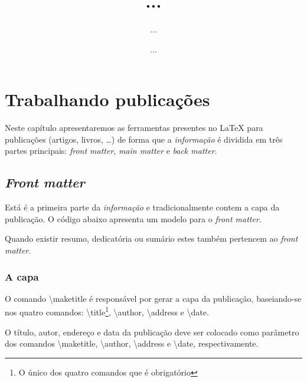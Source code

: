% 
% 
% 
% 
% 
\chapter{Trabalhando publicações} \label{sch:latex:publi}
Neste capítulo apresentaremos as ferramentas presentes no LaTeX para publicações (artigos, livros, \dots) de forma que a \textit{informação} é dividida em três partes principais: \textit{front matter}, \textit{main matter} e \textit{back matter}.

\section{\textit{Front matter}}

Está é a primeira parte da \textit{informação} e tradicionalmente contem a capa da publicação. O código abaixo apresenta um modelo para o \textit{front matter}.
\begin{latexcode}
    \frontmatter
    \title{...}
    \author{...}
    \address{...}
    \date{...}
    \maketitle
\end{latexcode}

Quando existir resumo, dedicatória ou sumário estes também pertencem ao \textit{front matter}.

\subsection{A capa}
O comando \textbackslash\textsf{maketitle} é responsável por gerar a capa da publicação, baseiando-se nos quatro comandos: \textbackslash\textsf{title}\footnote{O único dos quatro comandos que é obrigatório}, \textbackslash\textsf{author}, \textbackslash\textsf{address} e \textbackslash\textsf{date}.

O título, autor, endereço e data da publicação deve ser colocado como parâmetro dos comandos \textbackslash\textsf{maketitle}, \textbackslash\textsf{author}, \textbackslash\textsf{address} e \textbackslash\textsf{date}, respectivamente.

